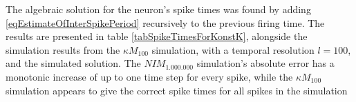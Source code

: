 		The algebraic solution for the neuron's spike times was found by adding \eqref{eqEstimateOfInterSpikePeriod} recursively to the previous firing time.
		The results are presented in table \ref{tabSpikeTimesForKonstK}, alongside the simulation results from the $\kappa M_{100}$ simulation, with a temporal resolution $l = 100$, 
				and the simulated solution.
 		The $NIM_{1.000.000}$ simulation's absolute error has a monotonic increase of up to one time step for every spike,
			while the $\kappa M_{100}$ simulation appears to give the correct spike times for all spikes in the simulation
		

